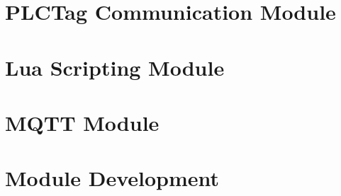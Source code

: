 	\chapter{PLCTag Communication Module}
	

	\chapter{Lua Scripting Module}
	

	\chapter{MQTT Module}
	

	\chapter{Module Development}




